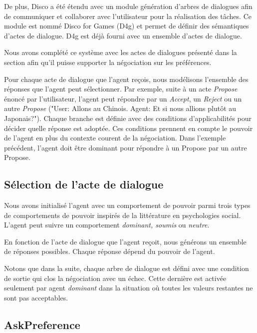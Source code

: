 	De plus, Disco a été étendu avec un module génération d'arbres de dialogues afin de communiquer et collaborer avec l'utilisateur pour la réalisation des tâches. Ce module est nommé Disco for Games (D4g) et permet de définir des sémantiques d'actes de dialogue. D4g est déjà fourni avec un ensemble d'actes de dialogue.
	
	Nous avons complété ce système avec les actes de dialogues présenté dans la section \label{sec:communication} afin qu'il puisse supporter la négociation sur les préférences.
	
	Pour chaque acte de dialogue que l'agent reçois, nous modélisons l'ensemble des réponses que l'agent peut sélectionner. Par exemple, suite à un acte \emph{Propose} énoncé par l'utilisateur, l'agent peut répondre par un \emph{Accept}, un \emph{Reject} ou un autre \emph{Propose} ("User: Allons au Chinois. Agent: Et si nous allions plutôt au Japonais?"). 
	Chaque branche est définie avec des conditions d'applicabilités pour décider quelle réponse est adoptée. 
	Ces conditions prennent en compte le pouvoir de l'agent en plus du contexte courent de la négociation. Dans l'exemple précédent, l'agent doit être dominant pour répondre à un Propose par un autre Propose. 
	
	

	
	\subsection{Sélection de l'acte de dialogue}
		Nous avons initialisé l'agent avec un comportement de pouvoir parmi trois types de comportements de pouvoir inspirés de la littérature en psychologies social.  L'agent peut suivre un comportement \emph{dominant, soumis} ou \emph{neutre}. 
		
		En fonction de l'acte de dialogue que l'agent reçoit, nous générons un ensemble de réponses possibles. Chaque réponse dépend du pouvoir de l'agent.
		
		Notons que dans la suite, chaque arbre de dialogue est défini avec une condition de sortie qui clos la négociation avec un échec. Cette dernière est activée seulement par agent \emph{dominant} dans la situation où toutes les valeurs restantes ne sont pas acceptables. 
		
		\subsection{AskPreference}
	
	
